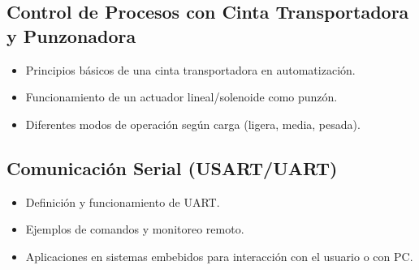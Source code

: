 \subsection{Control de Procesos con Cinta Transportadora y Punzonadora}
\begin{itemize}
    \item Principios básicos de una cinta transportadora en automatización.
    \item Funcionamiento de un actuador lineal/solenoide como punzón.
    \item Diferentes modos de operación según carga (ligera, media, pesada).
\end{itemize}


\subsection{Comunicación Serial (USART/UART)}
\begin{itemize}
    \item Definición y funcionamiento de UART.
    \item Ejemplos de comandos y monitoreo remoto.
    \item Aplicaciones en sistemas embebidos para interacción con el usuario o con PC.
\end{itemize}



